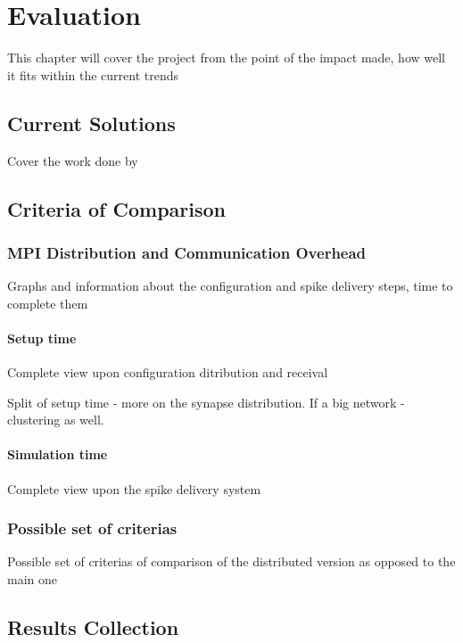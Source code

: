 \chapter{Evaluation}

This chapter will cover the project from the point of the impact made, how well it fits within the current trends

\section{Current Solutions}

Cover the work done by 

\section{Criteria of Comparison}

\subsection{MPI Distribution and Communication Overhead}

Graphs and information about the configuration and spike delivery steps, time to complete them

\subsubsection{Setup time}

Complete view upon configuration ditribution and receival

Split of setup time - more on the synapse distribution.
If a big network - clustering as well.

\subsubsection{Simulation time}

Complete view upon the spike delivery system

\subsection{Possible set of criterias}

Possible set of criterias of comparison of the distributed version as opposed to the main one

\section{Results Collection}

